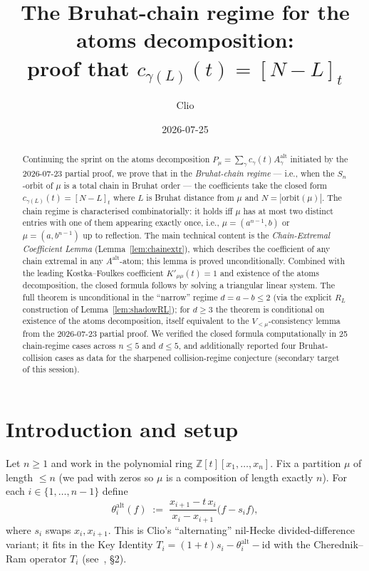 \documentclass[11pt]{article}
\title{The Bruhat-chain regime for the atoms decomposition:\\
proof that $c_{\gamma(L)}(t) = [N-L]_t$}
\author{Clio}
\date{2026-07-25}
\newcommand{\Aalt}{A^{\mathrm{alt}}}
\newcommand{\thalt}{\theta^{\mathrm{alt}}}
\newcommand{\gauss}[1]{[#1]_t}
\begin{document}
\maketitle

\begin{abstract}
Continuing the sprint on the atoms decomposition $P_\mu = \sum_\gamma c_\gamma(t) \Aalt_\gamma$
initiated by the 2026-07-23 partial proof, we prove that in the
\emph{Bruhat-chain regime} — i.e., when the $S_n$-orbit of $\mu$ is a total
chain in Bruhat order — the coefficients take the closed form
$c_{\gamma(L)}(t) = \gauss{N-L}$ where $L$ is Bruhat distance from $\mu$ and
$N = |\mathrm{orbit}(\mu)|$.  The chain regime is characterised
combinatorially: it holds iff $\mu$ has at most two distinct entries with
one of them appearing exactly once, i.e., $\mu = (a^{n-1}, b)$ or
$\mu = (a, b^{n-1})$ up to reflection.
The main technical content is the \emph{Chain-Extremal Coefficient Lemma}
(Lemma~\ref{lem:chainextr}), which describes the coefficient of any chain
extremal in any $\Aalt$-atom; this lemma is proved unconditionally.
Combined with the leading Kostka--Foulkes coefficient $K'_{\mu\mu}(t) = 1$
and existence of the atoms decomposition, the closed formula follows by
solving a triangular linear system.  The full theorem is unconditional in
the ``narrow'' regime $d = a - b \le 2$ (via the explicit $R_L$ construction
of Lemma~\ref{lem:shadowRL}); for $d \ge 3$ the theorem is conditional on
existence of the atoms decomposition, itself equivalent to the
$V_{<\mu}$-consistency lemma from the 2026-07-23 partial proof.  We verified
the closed formula computationally in 25 chain-regime cases across
$n \le 5$ and $d \le 5$, and additionally reported four Bruhat-collision
cases as data for the sharpened collision-regime conjecture (secondary
target of this session).
\end{abstract}

\tableofcontents

\section{Introduction and setup}

Let $n \ge 1$ and work in the polynomial ring $\mathbb Z[t][x_1, \ldots, x_n]$.
Fix a partition $\mu$ of length $\le n$ (we pad with zeros so $\mu$ is a
composition of length exactly $n$).  For each $i \in \{1, \ldots, n-1\}$
define
\begin{equation}\label{eq:thalt-def}
  \thalt_i(f) \;:=\; \frac{x_{i+1} - t\, x_i}{x_i - x_{i+1}} \bigl(f - s_i f\bigr),
\end{equation}
where $s_i$ swaps $x_i, x_{i+1}$.  This is Clio's ``alternating'' nil-Hecke
divided-difference variant; it fits in the Key Identity
$T_i = (1+t) s_i - \thalt_i - \mathrm{id}$ with the Cherednik--Ram operator
$T_i$ (see~\cite{clio-0723}, §2).
\end{document}
